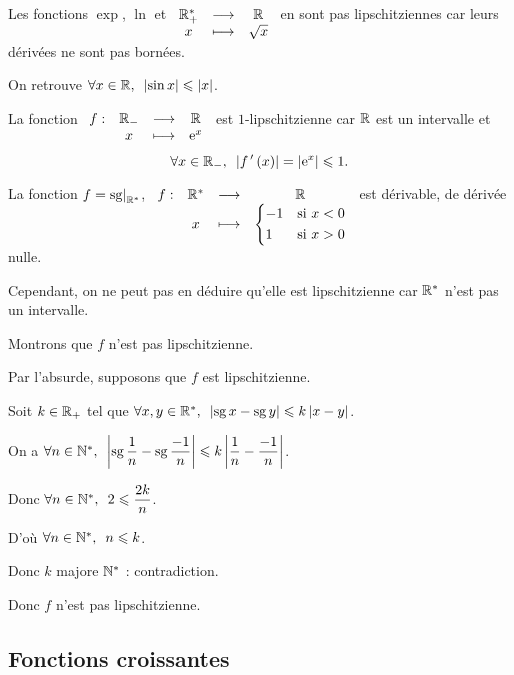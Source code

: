 \begin{ex}
Les fonctions \(\exp\), \(\ln\) et \(\begin{array}[t]{ccc}\mathbb{R}_+^* & \longrightarrow & \mathbb{R} \\ x & \longmapsto & \sqrt{x}\end{array}\) en sont pas lipschitziennes car leurs dérivées ne sont pas bornées.
\end{ex}

\begin{ex}
On retrouve \(\quantifs{\forall x\in\R}\abs{\sin x}\leq\abs{x}\).
\end{ex}

\begin{ex}
La fonction \(\begin{array}[t]{cccc}f : & \mathbb{R}_- & \longrightarrow & \mathbb{R} \\ & x & \longmapsto & \mathrm{e}^{x}\end{array}\) est \(1\)-lipschitzienne car \(\mathbb{R}\) est un intervalle et \[\quantifs{\forall x\in\Rm}\abs{f\prim\paren{x}}=\abs{\e{x}}\leq1.\]
\end{ex}

\begin{ex}
La fonction \(f=\restr{\sg}{\Rs}\), \cad \(\begin{array}[t]{cccc}f : & \mathbb{R}^* & \longrightarrow & \mathbb{R} \\ & x & \longmapsto & \begin{dcases}-1 &\text{si }x<0 \\ 1 &\text{si }x>0\end{dcases}\end{array}\) est dérivable, de dérivée nulle.

Cependant, on ne peut pas en déduire qu'elle est lipschitzienne car \(\mathbb{R}^*\) n'est pas un intervalle.

Montrons que \(f\) n'est pas lipschitzienne.

Par l'absurde, supposons que \(f\) est lipschitzienne.

Soit \(k\in\mathbb{R}_+\) tel que \(\quantifs{\forall x,y\in\Rs}\abs{\sg x-\sg y}\leq k\abs{x-y}\).

On a \(\quantifs{\forall n\in\Ns}\abs{\sg\dfrac{1}{n}-\sg\dfrac{-1}{n}}\leq k\abs{\dfrac{1}{n}-\dfrac{-1}{n}}\).

Donc \(\quantifs{\forall n\in\Ns}2\leq\dfrac{2k}{n}\).

D'où \(\quantifs{\forall n\in\Ns}n\leq k\).

Donc \(k\) majore \(\mathbb{N}^*\) : contradiction.

Donc \(f\) n'est pas lipschitzienne.
\end{ex}

\subsection{Fonctions croissantes}

